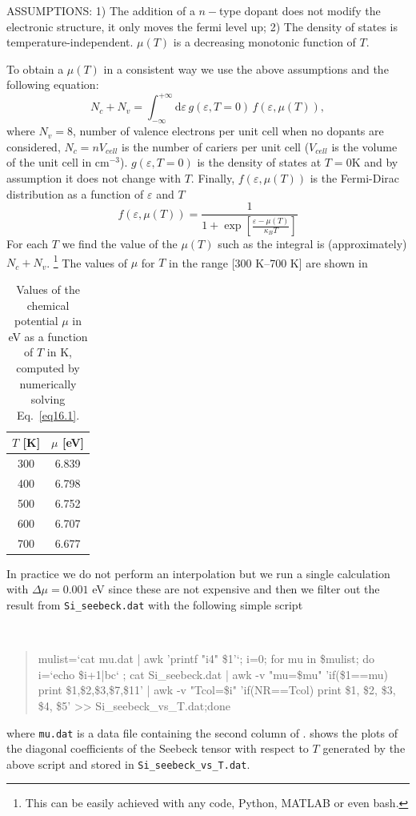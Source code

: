 \begin{itemize}
ASSUMPTIONS: 1) The addition of a $n-$type dopant does not modify the electronic structure, it only moves the fermi level up; 2) The density of states is temperature-independent. $\mu(T)$ is a decreasing monotonic function of $T$.

To obtain a $\mu(T)$ in a consistent way we use the above assumptions and the following equation:
\begin{equation}
N_c + N_v = \int_{-\infty}^{+\infty}\! \mathrm{d}\varepsilon \, g(\varepsilon,T=0)\,f(\varepsilon,\mu(T)),\label{eq16.1}
\end{equation}
where $N_v=8$, number of valence electrons per unit cell when no dopants are considered, $N_c= nV_{cell}$ is the number of cariers per unit cell ($V_{cell}$ is the volume of the unit cell in cm$^{-3}$). $g(\varepsilon,T=0)$ is the density of states at $T=0$K and by assumption it does not change with $T$. Finally, $f(\varepsilon,\mu(T))$ is the Fermi-Dirac distribution as a function of $\varepsilon$ and $T$
\begin{equation}
f(\varepsilon,\mu(T)) = \frac{1}{1 + \exp[\frac{\varepsilon - \mu(T)}{\kappa_B T}]}
\end{equation}
For each $T$ we find the value of the $\mu(T)$ such as the integral is (approximately) $N_c + N_v$. %
\footnote{\footnotesize{This can be easily achieved with any code, \eg{} Python, MATLAB or even bash.}}
The values of $\mu$ for $T$ in the range [300 K--700 K] are shown in 
\begin{table}
\centering
\captionsetup{width=.5\textwidth}
\caption{Values of the chemical potential $\mu$ in eV as a function of $T$ in K, computed by numerically solving Eq.~\ref{eq16.1}.}
\begin{tabular}{@{} cc @{}}\toprule[1.5pt]
$T$ [K] & $\mu$ [eV] \\\midrule
300 & 6.839 \\
400 & 6.798 \\
500 & 6.752 \\
600 & 6.707 \\
700 & 6.677 \\\bottomrule[1pt]
\end{tabular}\label{tab16.1}
\end{table} 

In practice we do not perform an interpolation but we run a single calculation with $\Delta \mu = 0.001$ eV since these are not expensive and then we filter out the result from {\tt Si\_seebeck.dat} with the following simple script
{\tt
\begin{quote}
mulist=`cat mu.dat | awk '{printf "i4" \$1}'`; i=0; for mu in \$mulist; do i=`echo \$i+1|bc` ; cat Si\_seebeck.dat | awk -v "mu=\$mu" '{if(\$1==mu) print \$1,\$2,\$3,\$7,\$11}' | awk -v "Tcol=\$i" '{if(NR==Tcol) print \$1, \$2, \$3, \$4, \$5}' >> Si\_seebeck\_vs\_T.dat;done
\end{quote}
}
where {\tt mu.dat} is a data file containing the second column of .  shows the plots of the diagonal coefficients of the Seebeck tensor with respect to $T$ generated by the above script and stored in {\tt Si\_seebeck\_vs\_T.dat}.


\end{itemize}
